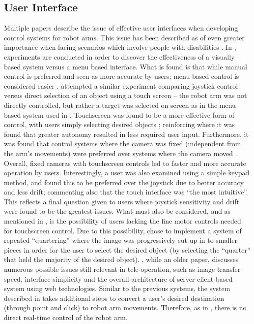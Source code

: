 \documentclass[11pt]{article} %
\begin{document}
\subsection{User Interface}
Multiple papers describe the issue of effective user interfaces when developing control systems for robot arms. This issue has been described as of even greater importance when facing scenarios which involve people with disabilities \cite{Tsui2008}.
In \cite{tsui2007simplifying}, experiments are conducted in order to discover the effectiveness of a visually based system versus a menu based interface.  What is found is that while manual control is preferred and seen as more accurate by users; menu based control is considered easier \cite{tsui2007simplifying}. \cite{Tsui2008} attempted a similar experiment comparing joystick control versus direct selection of an object using a touch screen – the robot arm was not directly controlled, but rather a target was selected on screen as in the menu based system used in \cite{tsui2007simplifying}. Touchscreen was found to be a more effective form of control, with users simply selecting desired objects \cite{Tsui2008}; reinforcing \cite{tsui2007simplifying} where it was found that greater autonomy resulted in less required user input. Furthermore, it was found that control systems where the camera was fixed (independent from the arm's movements) were preferred over systems where the camera moved \cite{Tsui2008}. Overall, fixed cameras with touchscreen controls led to faster and more accurate operation by users. Interestingly, a user was also examined using a simple keypad method, and found this to be preferred over the joystick due to better accuracy and less drift; commenting also that the touch interface was “the most intuitive”. This reflects a final question given to users where joystick sensitivity and drift were found to be the greatest issues. \cite{Tsui2008}
What must also be considered, and as mentioned in \cite{tsui2007simplifying}, is the possibility of users lacking the fine motor controls needed for touchscreen control. Due to this possibility, \cite{tsui2007simplifying} chose to implement a system of repeated “quartering” where the image was progressively cut up in to smaller pieces in order for the user to select the desired object (by selecting the “quarter” that held the majority of the desired object).
\cite{goldberg1995desktop}, while an older paper, discusses numerous possible issues still relevant in tele-operation, such as image transfer speed, interface simplicity and the overall architecture of server-client based system using web technologies. Similar to the previous systems, the system described in \cite{goldberg1995desktop} takes additional steps to convert a user's desired destination (through point and click) to robot arm movements. Therefore, as in \cite{Tsui2008}, there is no direct real-time control of the robot arm. 
\end{document}
